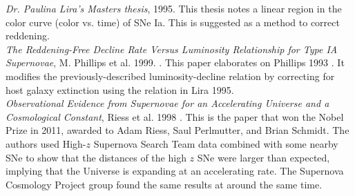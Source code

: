 \noindent\textit{Dr. Paulina Lira's Masters thesis}, 1995. This thesis notes a linear region in the color curve (color vs. time) of SNe Ia. This is suggested as a method to correct reddening. \\

\noindent\textit{The Reddening-Free Decline Rate Versus Luminosity Relationship for Type IA Supernovae}, M. Phillips et al. 1999. \cite{Phillips1999}. This paper elaborates on Phillips 1993 \cite{Phillips1993}. It modifies the previously-described luminosity-decline relation by correcting for host galaxy extinction using the relation in Lira 1995.\\

\noindent\textit{Observational Evidence from Supernovae for an Accelerating Universe and a Cosmological Constant}, Riess et al. 1998 \cite{Riess1998}. This is the paper that won the Nobel Prize in 2011, awarded to Adam Riess, Saul Perlmutter, and Brian Schmidt. The authors used High-$z$ Supernova Search Team data combined with some nearby SNe to show that the distances of the high $z$ SNe were larger than expected, implying that the Universe is expanding at an accelerating rate. The Supernova Cosmology Project group found the same results at around the same time.\\